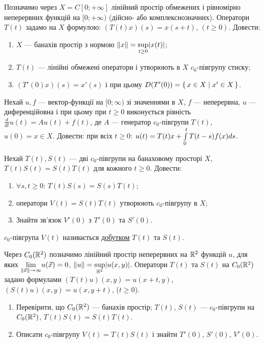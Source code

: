 \begin{exercise}
    Позначимо через $X = C[0;+\infty]$ лінійний простір обмежених і рівномірно неперервних
    функцій на $[0;+\infty)$ (дійсно- або комплекснозначних). Оператори $T(t)$ задамо на $X$
    формулою: $(T(t)x)(s) = x(s+t)$, $(t \geq 0)$. Довести:
    \begin{enumerate}
        \item $X$ --- банахів простір з нормою $\left\lVert x\right\rVert = \underset{t \geq 0}{\sup} |x(t)|$;
        \item $T(t)$ --- лінійні обмежені оператори і утворюють в $X$ $c_0$-півгрупу стиску;
        \item $(T'(0)x)(s) = x'(s)$ і при цьому $D(T'(0)) = \set{x\in X \mid x' \in X}$.
    \end{enumerate}
\end{exercise}

\begin{exercise}
    Нехай $u, f$ --- вектор-функції на $[0; \infty)$ зі значеннями в $X$,
    $f$ --- неперервна, $u$ --- диференційовна і при цьому при $t \geq 0$ виконується рівність
    $\frac{d}{dt}u(t) = A u(t) +f(t)$, де $A$ --- генератор $c_0$-півгрупи $T(t)$, $u(0) = x \in X$.
    Довести: при всіх $t \geq 0$: $u(t) = T(t)x +\int\limits_{0}^{t} T(t-s)f(x) ds$.
\end{exercise}

\begin{exercise}
    Нехай $T(t), S(t)$ --- дві $c_0$-півгрупи на банаховому просторі $X$, $T(t)S(t) = S(t)T(t)$
    для кожного $t \geq 0$. Довести:
    \begin{enumerate}
        \item $\forall s,t \geq 0$: $T(t)S(s) = S(s)T(t)$;
        \item оператори $V(t) = S(t)T(t)$ утворюють $c_0$-півгрупу в $X$;
        \item Знайти зв'язок $V'(0)$ з $T'(0)$ та $S'(0)$.
    \end{enumerate}
\end{exercise}

\begin{theory}
    $c_0$-півгрупа $V(t)$ називається \ul{добутком} $T(t)$ та $S(t)$.
\end{theory}

\begin{exercise}
    Через $C_0 (\mathbb{R}^2)$ позначимо лінійний простір неперервних на $\mathbb{R}^2$ функцій $u$,
    для яких $\underset{\left\lVert\vec{x}\right\rVert\to \infty}{\lim} u(\vec{x}) = 0$,
    $\left\lVert u\right\rVert = \underset{\mathbb{R}^2}{\sup} |u(x,y)|$. Оператори $T(t)$ та $S(t)$ на $C_0 (\mathbb{R}^2)$
    задано формулами $(T(t)u)(x,y) = u(x+t, y)$, $(S(t)u)(x,y) = u(x, y+t)$, ($t\geq 0$).
    \begin{enumerate}
        \item Перевірити, що $C_0 (\mathbb{R}^2)$ --- банахів простір; $T(t)$, $S(t)$ --- $c_0$-півгрупи на
        $C_0 (\mathbb{R}^2)$, $T(t)S(t) = S(t)T(t)$.
        \item Описати $c_0$-півгрупу $V(t) = T(t)S(t)$ і знайти $T'(0)$, $S'(0)$, $V'(0)$.
    \end{enumerate}
\end{exercise}